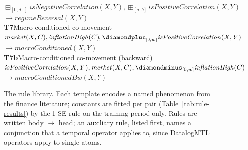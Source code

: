 \begin{figure}[t]
{\begin{minipage}{0.95\textwidth}
\hspace*{1.5em}\mbox{$\boxminus_{[0, d^{-}]}\mathit{isNegativeCorrelation}(X,Y), \boxplus_{[a,b]}\mathit{isPositiveCorrelation}(X,Y)$}\\
\hspace*{1.5em}\hspace*{3em}\mbox{$\to \mathit{regimeReversal}(X,Y)$}\\[5pt]
\textbf{T7}\quad Macro-conditioned co-movement~\cite{bekaert2013risk}\hspace{1em plus 1fill}{\footnotesize (fitted constants: $w$)}\\
\hspace*{1.5em}\mbox{$\mathit{market}(X,C), \mathit{inflationHigh}(C), \diamondplus_{[0,w]} \mathit{isPositiveCorrelation}(X,Y)$}\\
\hspace*{1.5em}\hspace*{3em}\mbox{$\to \mathit{macroConditioned}(X,Y)$}\\[5pt]
\textbf{T7b}\quad Macro-conditioned co-movement (backward)~\cite{bekaert2013risk}\hspace{1em plus 1fill}{\footnotesize (fitted constants: $w$)}\\
\hspace*{1.5em}\mbox{$\mathit{isPositiveCorrelation}(X,Y), \mathit{market}(X,C), \diamondminus_{[0,w]} \mathit{inflationHigh}(C)$}\\
\hspace*{1.5em}\hspace*{3em}\mbox{$\to \mathit{macroConditionedBw}(X,Y)$}
\end{minipage}}
\caption{The rule library. Each template encodes a named phenomenon from the finance literature; constants are fitted per pair (Table~\ref{tab:rule-results}) by the 1-SE rule on the training period only. Rules are written body $\to$ head; an auxiliary rule, listed first, names a conjunction that a temporal operator applies to, since DatalogMTL operators apply to single atoms.}
\label{fig:rule-library}
\end{figure}
